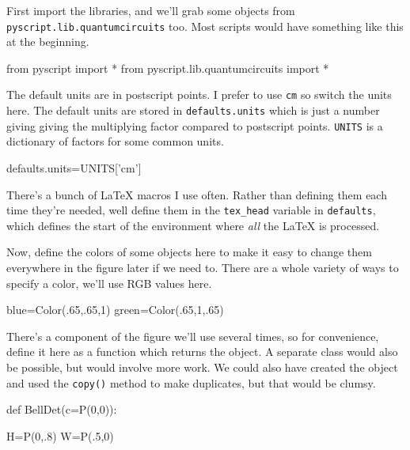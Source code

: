 \documentclass[a4paper]{book}
\begin{document}
First import the \pyscript libraries, and we'll grab some objects
from \Verb|pyscript.lib.quantumcircuits| too. Most scripts would have
something like this at the beginning.
\begin{python}
from pyscript import *
from pyscript.lib.quantumcircuits import *
\end{python}
The default units are in postscript points. I prefer to use
\texttt{cm} so switch the units here. The default units are stored in
\Verb|defaults.units| which is just a number giving giving the
multiplying factor compared to postscript points. \Verb|UNITS| is a
dictionary of factors for some common units.
\begin{python}
defaults.units=UNITS['cm']
\end{python}
There's a bunch of \LaTeX{} macros I use often. Rather than defining
them each time they're needed, well define them in the \Verb|tex_head|
variable in \Verb|defaults|, which defines the start of the
environment where \emph{all} the \LaTeX{} is processed.
Now, define the colors of some objects here to make it easy to change
them everywhere in the figure later if we need to. There are a whole
variety of ways to specify a color, we'll use RGB values here.
\begin{python}
blue=Color(.65,.65,1)
green=Color(.65,1,.65)
\end{python}
There's a component of the figure we'll use several times, so for
convenience, define it here as a function which returns the object. 
A separate class would also be possible, but would involve more work.
We could also have created the object and used the \Verb|copy()| method
to make duplicates, but that would be clumsy.
\begin{python}
def BellDet(c=P(0,0)):

    H=P(0,.8)
    W=P(.5,0)
\end{python}
\end{document}

